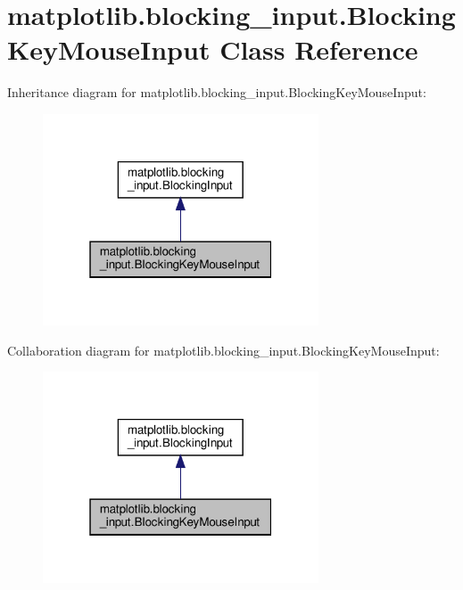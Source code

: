\hypertarget{classmatplotlib_1_1blocking__input_1_1BlockingKeyMouseInput}{}\section{matplotlib.\+blocking\+\_\+input.\+Blocking\+Key\+Mouse\+Input Class Reference}
\label{classmatplotlib_1_1blocking__input_1_1BlockingKeyMouseInput}


Inheritance diagram for matplotlib.\+blocking\+\_\+input.\+Blocking\+Key\+Mouse\+Input\+:
\nopagebreak
\begin{figure}[H]
\begin{center}
\leavevmode
\includegraphics[width=232pt]{classmatplotlib_1_1blocking__input_1_1BlockingKeyMouseInput__inherit__graph}
\end{center}
\end{figure}


Collaboration diagram for matplotlib.\+blocking\+\_\+input.\+Blocking\+Key\+Mouse\+Input\+:
\nopagebreak
\begin{figure}[H]
\begin{center}
\leavevmode
\includegraphics[width=232pt]{classmatplotlib_1_1blocking__input_1_1BlockingKeyMouseInput__coll__graph}
\end{center}
\end{figure}

